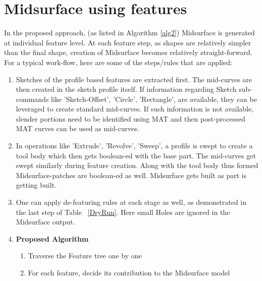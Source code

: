 \section{Midsurface using features}

In the proposed approach, (as listed in Algorithm \ref{alg2}) Midsurface is generated at individual feature level. At each feature step, as shapes are relatively simpler than the final shape, creation of Midsurface becomes relatively straight-forward. For a typical work-flow, here are some of the steps/rules that are applied:

\begin{enumerate}
\item Sketches of the profile based features are extracted first. The mid-curves are then created in the sketch profile itself. If information regarding Sketch sub-commands like 'Sketch-Offset', 'Circle', 'Rectangle', are available, they can be leveraged to create standard mid-curves. If such information is not available, slender portions need to be identified using MAT and then post-processed MAT curves can be used as mid-curves.
\item In operations like 'Extrude', 'Revolve', 'Sweep', a profile is swept to create a tool body which then gets boolean-ed with the base part. The mid-curves get swept similarly during feature creation. Along with the tool body thus formed Midsurface-patches are boolean-ed as well. Midsurface gets built as part is getting built. 
\item One can apply de-featuring rules at each stage as well, as demonstrated in the last step of Table ~\ref{DryRun}. Here small Holes are ignored in the Midsurface output. 

\item {\bf Proposed Algorithm}

	\begin{enumerate}
	
	\item Traverse the Feature tree one by one
	\item For each feature, decide its contribution to the Midsurface model
	

\end{enumerate}
\end{enumerate}
